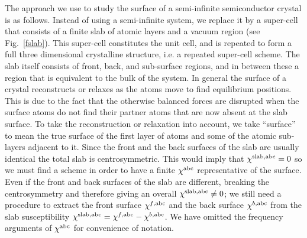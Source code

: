 \documentclass[floatfix,prb,aps,superscriptaddress,showpacs,11pt,preprint,letterpaper]{revtex4}
\begin{document}
The approach we use to study the surface of a semi-infinite
semiconductor crystal is as follows. Instead of using a
semi-infinite system, we replace it by a super-cell that 
consists of a finite
slab of atomic layers and a vacuum region (see Fig.~\ref{fslab}). This
super-cell constitutes the unit cell, and
is repeated to form a full three dimensional crystalline structure,
i.e. a repeated super-cell scheme. 
The slab itself consists of front, back, and 
sub-surface regions, and in between these
a region that is equivalent to the
bulk of the system. 
In general the surface of a crystal reconstructs or relaxes as the atoms
move to find equilibrium positions. This is due to the fact that
the otherwise
balanced forces are disrupted when the surface atoms do not find their 
partner atoms that are now absent at the slab surface.
To take the reconstruction or relaxation into account, 
we take ``surface'' to mean
the true surface of the first layer of atoms and
some of the atomic sub-layers adjacent to it.
Since the front and the back
surfaces of the slab are usually identical the total slab is
centrosymmetric. This would imply that 
$\chi^{\mathrm{slab},\mathrm{a}\mathrm{b}\mathrm{c}}=0$ so we must
find a scheme 
in order to have a finite $\chi^{\mathrm{a}\mathrm{b}\mathrm{c}}$ representative of the
surface. Even if the front and back surfaces of the slab 
are different, breaking the centrosymmetry and therefore giving an
overall $\chi^{\mathrm{slab},\mathrm{a}\mathrm{b}\mathrm{c}}\ne 0$; we still
need a procedure to extract the front surface $\chi^{f,\mathrm{a}\mathrm{b}\mathrm{c}}$
and the back surface $\chi^{b,\mathrm{a}\mathrm{b}\mathrm{c}}$ from the slab
susceptibility 
$\chi^{\mathrm{slab},\mathrm{a}\mathrm{b}\mathrm{c}}=\chi^{f,\mathrm{a}\mathrm{b}\mathrm{c}}-\chi^{b,\mathrm{a}\mathrm{b}\mathrm{c}}$.
We have omitted the frequency arguments of $\chi^{\mathrm{a}\mathrm{b}\mathrm{c}}$ for 
convenience of notation.
\end{document}
